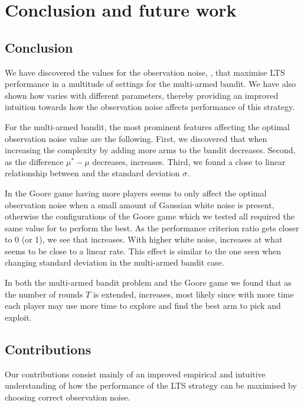 \chapter{Conclusion and future work}
\label{ch:conclusion}

\section{Conclusion}

We have discovered the values for the observation noise, \ob{}, that maximise LTS performance in a multitude of settings for the multi-armed bandit.
We have also shown how \obstar{} varies with different parameters, thereby providing an improved intuition towards how the observation noise affects performance of this strategy.


For the multi-armed bandit, the most prominent features affecting the optimal observation noise value are the following.
First, we discovered that when increasing the complexity by adding more arms to the bandit \obstar{} decreases.
Second, as the difference $\mu^* - \mu$ decreases, \obstar{} increases.
Third, we found a close to linear relationship between \obstar{} and the standard deviation $\sigma$.

In the Goore game having more players seems to only affect the optimal observation noise when a small amount of Gaussian white noise is present, otherwise the configurations of the Goore game which we tested all required the same value for \obstar{} to perform the best.
As the performance criterion ratio gets closer to 0 (or 1), we see that \obstar{} increases.
With higher white noise, \obstar{} increases at what seems to be close to a linear rate.
This effect is similar to the one seen when changing standard deviation in the multi-armed bandit case.

In both the multi-armed bandit problem and the Goore game we found that as the number of rounds $T$ is extended, \obstar{} increases, most likely since with more time each player may use more time to explore and find the best arm to pick and exploit.


\section{Contributions}
Our contributions consist mainly of an improved empirical and intuitive understanding of how the performance of the LTS strategy can be maximised by choosing correct observation noise.


